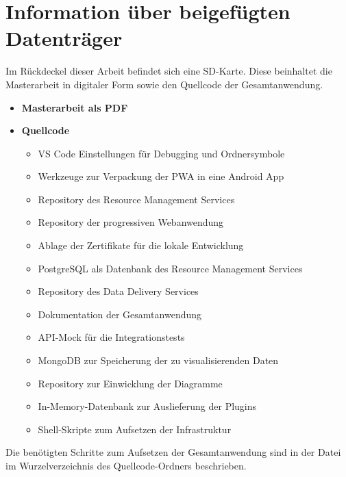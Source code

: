 \chapter{Information über beigefügten Datenträger}
\label{chap:informationueberbeigefuegtendatentraeger}
Im Rückdeckel dieser Arbeit befindet sich eine SD-Karte. Diese beinhaltet
die Masterarbeit in digitaler Form sowie den Quellcode der Gesamtanwendung.

\begin{small}
\begin{itemize}[noitemsep,nolistsep]
    \item \textbf{Masterarbeit als PDF}
    \item \textbf{Quellcode}
    \begin{itemize}[noitemsep,nolistsep]
        \item {} VS Code Einstellungen für Debugging und Ordnersymbole
        \item {} Werkzeuge zur Verpackung der PWA in eine Android App
        \item {} Repository des Resource Management Services
        \item {} Repository der progressiven Webanwendung
        \item {} Ablage der Zertifikate für die lokale Entwicklung
        \item {} PostgreSQL als Datenbank des Resource Management Services
        \item {} Repository des Data Delivery Services
        \item {} Dokumentation der Gesamtanwendung
        \item {} API-Mock für die Integrationstests
        \item {} MongoDB zur Speicherung der zu visualisierenden Daten
        \item {} Repository zur Einwicklung der Diagramme
        \item {} In-Memory-Datenbank zur Auslieferung der Plugins
        \item {} Shell-Skripte zum Aufsetzen der Infrastruktur
    \end{itemize}
\end{itemize}
\end{small}

\bigskip

\begin{small}
\begin{myboxi}[Hinweis]
Die benötigten Schritte zum Aufsetzen der Gesamtanwendung sind in der 
 Datei im Wurzelverzeichnis des Quellcode-Ordners beschrieben.
\end{myboxi}
\end{small}
